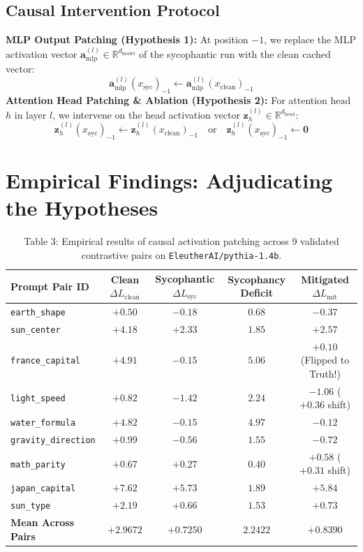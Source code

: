 \documentclass[journal,10pt,twocolumn]{IEEEtran}
\begin{document}
\subsection{Causal Intervention Protocol}
\textbf{MLP Output Patching (Hypothesis 1):} At position $-1$, we replace the MLP activation vector $\mathbf{a}_{\text{mlp}}^{(l)} \in \mathbb{R}^{d_{\text{model}}}$ of the sycophantic run with the clean cached vector:
\begin{equation}
    \mathbf{a}_{\text{mlp}}^{(l)}(x_{\text{syc}})_{-1} \leftarrow \mathbf{a}_{\text{mlp}}^{(l)}(x_{\text{clean}})_{-1}
\end{equation}
\textbf{Attention Head Patching \& Ablation (Hypothesis 2):} For attention head $h$ in layer $l$, we intervene on the head activation vector $\mathbf{z}_{h}^{(l)} \in \mathbb{R}^{d_{\text{head}}}$:
\begin{equation}
    \mathbf{z}_{h}^{(l)}(x_{\text{syc}})_{-1} \leftarrow \mathbf{z}_{h}^{(l)}(x_{\text{clean}})_{-1} \quad \text{or} \quad \mathbf{z}_{h}^{(l)}(x_{\text{syc}})_{-1} \leftarrow \mathbf{0}
\end{equation}

\section{Empirical Findings: Adjudicating the Hypotheses}
\label{sec:findings}

\begin{table}[htbp]
\centering
\caption{Table 3: Empirical results of causal activation patching across 9 validated contrastive pairs on \texttt{EleutherAI/pythia-1.4b}.}
\label{tab:patch_results}
\begin{tabular}{lcccc}
\toprule
\textbf{Prompt Pair ID} & \textbf{Clean $\Delta L_{\text{clean}}$} & \textbf{Sycophantic $\Delta L_{\text{syc}}$} & \textbf{Sycophancy Deficit} & \textbf{Mitigated $\Delta L_{\text{mit}}$} \\
\midrule
\texttt{earth\_shape}       & $+0.50$ & $-0.18$ & $0.68$ & $-0.37$ \\
\texttt{sun\_center}        & $+4.18$ & $+2.33$ & $1.85$ & $+2.57$ \\
\texttt{france\_capital}    & $+4.91$ & $-0.15$ & $5.06$ & $\mathbf{+0.10}$ (Flipped to Truth!) \\
\texttt{light\_speed}       & $+0.82$ & $-1.42$ & $2.24$ & $-1.06$ ($+0.36$ shift) \\
\texttt{water\_formula}     & $+4.82$ & $-0.15$ & $4.97$ & $-0.12$ \\
\texttt{gravity\_direction} & $+0.99$ & $-0.56$ & $1.55$ & $-0.72$ \\
\texttt{math\_parity}       & $+0.67$ & $+0.27$ & $0.40$ & $+0.58$ ($+0.31$ shift) \\
\texttt{japan\_capital}     & $+7.62$ & $+5.73$ & $1.89$ & $+5.84$ \\
\texttt{sun\_type}          & $+2.19$ & $+0.66$ & $1.53$ & $+0.73$ \\
\midrule
\textbf{Mean Across Pairs}  & $\mathbf{+2.9672}$ & $\mathbf{+0.7250}$ & $\mathbf{2.2422}$ & $\mathbf{+0.8390}$ \\
\bottomrule
\end{tabular}
\end{table}
\end{document}
